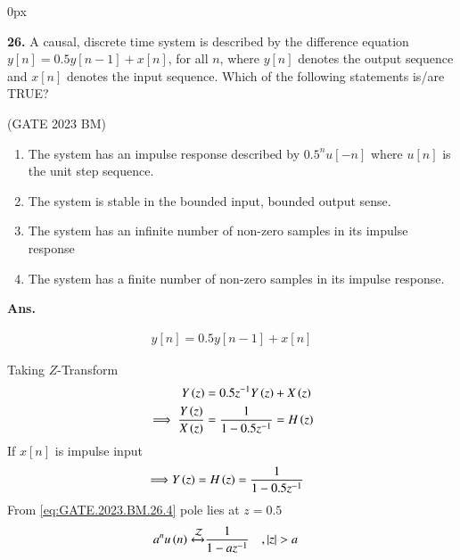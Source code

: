\documentclass[journal,12pt,twocolumn]{IEEEtran}
\begin{document}
\parindent 0px


\vspace{3cm}

\title{}
\author{EE23BTECH11042 -  Khusinadha Naik$^{*}$
}
\maketitle
\newpage
\bigskip



\noindent \textbf{26.} \hspace{2pt}A causal, discrete time system is described by the difference equation $y[n] = 0.5 y[n-1] + x[n]$, for all $n$, where $y[n]$ denotes the output sequence and $x[n]$ denotes the input sequence. Which of the following statements is/are TRUE?
\begin{flushright}
\hfill(GATE 2023 BM)
\end{flushright}
\begin{enumerate}[label = (\alph*)]
	\item The system has an impulse response described by $0.5^{n} u[-n]$ where $u[n]$ is the  
unit step sequence. 	\label{option:GATE.2023.BM.26.1}	
	\item The system is stable in the bounded input, bounded output sense.		\label{option:GATE.2023.BM.26.2}
	\item The system has an infinite number of non-zero samples in its impulse response	\label{option:GATE.2023.BM.26.3}
	\item The system has a finite number of non-zero samples in its impulse response.	\label{option:GATE.2023.BM.26.4}
\end{enumerate}

\noindent \textbf{Ans.}\\

\begin{table}[h]

\end{table}
\begin{align}
y[n] = 0.5y[n-1] + x[n] 
\end{align}

Taking $Z$-Transform 
\begin{align}
Y\left(z\right) &= 0.5z^{-1}Y\left(z\right) + X\left(z\right) \\
\implies \frac{Y\left(z\right)}{X\left(z\right)} &= \frac{1}{1 - 0.5z^{-1}} = H\left(z\right) 
\end{align}
If $x[n]$ is impulse input 
\begin{align}
\implies &Y\left(z\right) = H\left(z\right) = \frac{1}{1 - 0.5z^{-1}}  \label{eq:GATE.2023.BM.26.4}
\end{align}
From \eqref{eq:GATE.2023.BM.26.4} pole lies at $z = 0.5$
\begin{align}
a^{n}u\left(n\right) \xleftrightarrow{\mathcal{Z}} &\frac{1}{1 - az^{-1}} \quad , \left\vert z\right\vert > a \label{eq:GATE.2023.BM.26.5}
\end{align}
\end{document}
